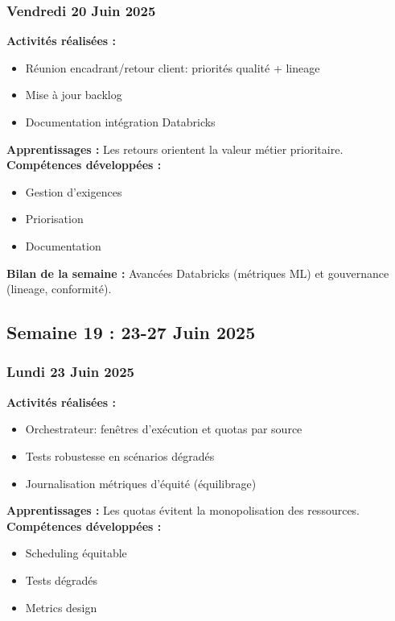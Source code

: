 \documentclass[12pt,a4paper]{article}
\begin{document}
\subsubsection{Vendredi 20 Juin 2025}
\textbf{Activités réalisées :}
\begin{itemize}
    \item Réunion encadrant/retour client: priorités qualité + lineage
    \item Mise à jour backlog
    \item Documentation intégration Databricks
\end{itemize}
\textbf{Apprentissages :} Les retours orientent la valeur métier prioritaire.
\textbf{Compétences développées :}
\begin{itemize}
    \item Gestion d'exigences
    \item Priorisation
    \item Documentation
\end{itemize}
\textbf{Bilan de la semaine :} Avancées Databricks (métriques ML) et gouvernance (lineage, conformité).

\clearpage
\subsection{Semaine 19 : 23-27 Juin 2025}

\subsubsection{Lundi 23 Juin 2025}
\textbf{Activités réalisées :}
\begin{itemize}
    \item Orchestrateur: fenêtres d'exécution et quotas par source
    \item Tests robustesse en scénarios dégradés
    \item Journalisation métriques d'équité (équilibrage)
\end{itemize}
\textbf{Apprentissages :} Les quotas évitent la monopolisation des ressources.
\textbf{Compétences développées :}
\begin{itemize}
    \item Scheduling équitable
    \item Tests dégradés
    \item Metrics design
\end{itemize}
\end{document}

